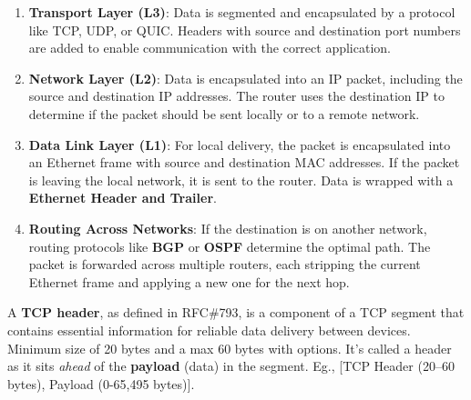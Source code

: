 \begin{enumerate}
    \item \textbf{Transport Layer (L3)}: Data is segmented and encapsulated by a protocol like TCP, UDP, or QUIC. Headers with source and destination port numbers are added to enable communication with the correct application.
    
    \item \textbf{Network Layer (L2)}: Data is encapsulated into an IP packet, including the source and destination IP addresses. The router uses the destination IP to determine if the packet should be sent locally or to a remote network.

    \item \textbf{Data Link Layer (L1)}: For local delivery, the packet is encapsulated into an Ethernet frame with source and destination MAC addresses. If the packet is leaving the local network, it is sent to the router. Data is wrapped with a \textbf{Ethernet Header and Trailer}.

    \item \textbf{Routing Across Networks}: If the destination is on another network, routing protocols like \textbf{BGP} or \textbf{OSPF} determine the optimal path. The packet is forwarded across multiple routers, each stripping the current Ethernet frame and applying a new one for the next hop.
\end{enumerate}
\newpage

\begin{Def}

    A \textbf{TCP header}, as defined in RFC\#793, is a component of a TCP segment that contains essential information for reliable data delivery between devices. 
    Minimum size of 20 bytes and a max 60 bytes with options. It's called a header as it sits \textit{ahead} of the \textbf{payload} (data) in the segment. Eg., [TCP Header (20–60 bytes), Payload (0-65,495 bytes)].
\hfill \cite{rfc793}
\end{Def}

